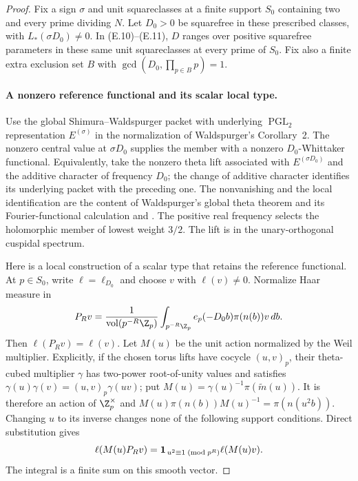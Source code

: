 \begin{proof}\leavevmode
Fix a sign $\sigma$ and unit squareclasses at a finite support $S_0$
containing two and every prime dividing $N$. Let $D_0>0$ be squarefree
in these prescribed classes, with $L_*(\sigma D_0)\ne0$.
In (E.10)--(E.11), $D$ ranges over positive squarefree parameters in
these same unit squareclasses at every prime of $S_0$.
Fix also a finite extra exclusion set $B$ with
$\gcd(D_0,\prod_{p\in B}p)=1$.

\paragraph{A nonzero reference functional and its scalar local type.}
Use the global Shimura--Waldspurger packet with underlying
$\operatorname{PGL}_2$ representation $E^{(\sigma)}$ in the
normalization of Waldspurger's Corollary~2. The nonzero central value
at $\sigma D_0$ supplies the member with a nonzero $D_0$-Whittaker
functional. Equivalently, take the nonzero theta lift associated with
$E^{(\sigma D_0)}$ and the additive character of frequency $D_0$;
the change of additive character identifies its underlying packet
with the preceding one. The nonvanishing and the local identification
are the content of Waldspurger's global theta theorem and its
Fourier-functional calculation
\cite[Theorem~1 and Proposition~1]{waldspurgerICM}
and \cite[Proposition~18 and its proof, pp.~466--467]{waldspurger}. The positive real frequency selects the
holomorphic member of lowest weight $3/2$. The lift is in the
unary-orthogonal cuspidal spectrum.

Here is a local construction of a scalar type that retains the
reference functional. At $p\in S_0$, write $\ell=\ell_{D_0}$ and
choose $v$ with $\ell(v)\ne0$. Normalize Haar measure in
\[
 P_Rv=\frac1{\operatorname{vol}(p^{-R}\Z_p)}
       \int_{p^{-R}\Z_p}
          e_p(-D_0b)\pi(n(b))v\,db .
\]
Then $\ell(P_Rv)=\ell(v)$. Let $M(u)$ be the unit action normalized
by the Weil multiplier. Explicitly, if the chosen torus lifts have
cocycle $(u,v)_p$, their theta-cubed multiplier $\gamma$ has
two-power root-of-unity values and satisfies
$\gamma(u)\gamma(v)=(u,v)_p\gamma(uv)$; put
$M(u)=\gamma(u)^{-1}\pi(\widetilde m(u))$.
It is therefore an action of
$\Z_p^\times$ and
$M(u)\pi(n(b))M(u)^{-1}=\pi(n(u^2b))$.
Changing $u$ to its inverse changes none of the following support
conditions. Direct substitution gives
\[
 \ell(M(u)P_Rv)=
 {\bf1}_{\,u^2\equiv1\;(\mathrm{mod}\;p^R)}
                    \ell(M(u)v).
\]
The integral is a finite sum on this smooth vector.


\end{proof}
